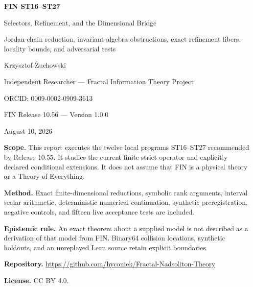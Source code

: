 \documentclass[11pt,a4paper]{article}
\begin{document}
\begin{titlepage}
\centering
\vspace*{1.45cm}
{\LARGE\bfseries FIN ST16--ST27\par}
\vspace{0.38cm}
{\Large Selectors, Refinement, and the Dimensional Bridge\par}
\vspace{0.45cm}
{\large Jordan-chain reduction, invariant-algebra obstructions, exact refinement fibers, locality bounds, and adversarial tests\par}
\vspace{1.20cm}
{\Large Krzysztof Żuchowski\par}
\vspace{0.24cm}
{\large Independent Researcher --- Fractal Information Theory Project\par}
{\large ORCID: 0009-0002-0909-3613\par}
\vspace{1.00cm}
{\large FIN Release 10.56 --- Version 1.0.0\par}
{\large August 10, 2026\par}
\vfill
\begin{minipage}{0.88\textwidth}
\textbf{Scope.} This report executes the twelve local programs ST16--ST27 recommended by Release 10.55. It studies the current finite strict operator and explicitly declared conditional extensions. It does not assume that FIN is a physical theory or a Theory of Everything.\par
\textbf{Method.} Exact finite-dimensional reductions, symbolic rank arguments, interval scalar arithmetic, deterministic numerical continuation, synthetic preregistration, negative controls, and fifteen live acceptance tests are included.\par
\textbf{Epistemic rule.} An exact theorem about a supplied model is not described as a derivation of that model from FIN. Binary64 collision locations, synthetic holdouts, and an unreplayed Lean source retain explicit boundaries.\par
\textbf{Repository.} \url{https://github.com/hyconiek/Fractal-Nadsoliton-Theory}\par
\textbf{License.} CC BY 4.0.
\end{minipage}
\end{titlepage}
\end{document}
